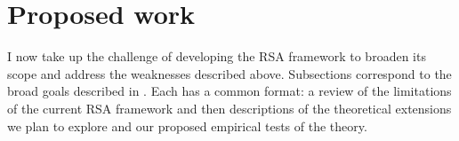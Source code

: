 \section{Proposed work}
\label{sec:proposed}

I now take up the challenge of developing the RSA framework to
broaden its scope and address the weaknesses described above.
Subsections correspond to the broad goals described in
. Each has a common format: a review of the
limitations of the current RSA framework and then descriptions of the
theoretical extensions we plan to explore and our proposed empirical
tests of the theory.



